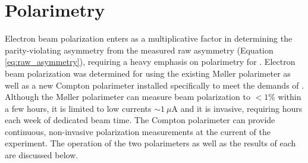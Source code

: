 \section{Polarimetry}
Electron beam polarization enters as a multiplicative factor in determining the parity-violating asymmetry from the measured raw asymmetry (Equation \ref{eq:raw_asymmetry}), requiring a heavy emphasis on polarimetry for \Q. Electron beam polarization was determined for \Qs using the existing M\o ller polarimeter as well as a new Compton polarimeter installed specifically to meet the demands of \Q. Although the M\o ller polarimeter can measure beam polarization to $<1\%$ within a few hours, it is limited to low currents $\sim 1~\mu$A and it is invasive, requiring hours each week of dedicated beam time. The Compton polarimeter can provide continuous, non-invasive polarization measurements at the current of the experiment. The operation of the two polarimeters as well as the results of each are discussed below.


